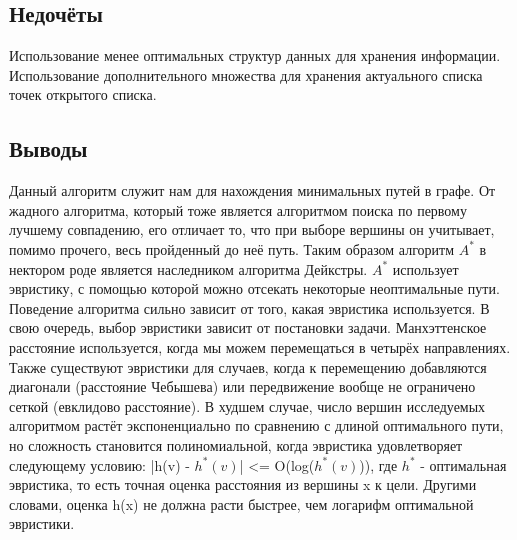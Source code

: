 \documentclass[12pt]{article}
\begin{document}
\subsection*{Недочёты}

Использование менее оптимальных структур данных для хранения информации.\\
Использование дополнительного множества для хранения актуального списка точек открытого списка.

\subsection*{Выводы}

Данный алгоритм служит нам для нахождения минимальных путей в графе. От жадного алгоритма, который тоже является алгоритмом поиска по первому лучшему совпадению, его отличает то, что при выборе вершины он учитывает, помимо прочего, весь пройденный до неё путь. Таким образом алгоритм $A^{*}$ в нектором роде является наследником алгоритма Дейкстры. $A^{*}$ использует эвристику, с помощью которой можно отсекать некоторые неоптимальные пути. Поведение алгоритма сильно зависит от того, какая эвристика используется. В свою очередь, выбор эвристики зависит от постановки задачи. Манхэттенское расстояние используется, когда мы можем перемещаться в четырёх направлениях. Также существуют эвристики для случаев, когда к перемещению добавляются диагонали (расстояние Чебышева) или передвижение вообще не ограничено сеткой (евклидово расстояние). В худшем случае, число вершин исследуемых алгоритмом растёт экспоненциально по сравнению с длиной оптимального пути, но сложность становится полиномиальной, когда эвристика удовлетворяет следующему условию: |h(v) - $h^{*}(v)$| <= O(log($h^{*}(v)$)), где $h^{*}$ - оптимальная эвристика, то есть точная оценка расстояния из вершины x к цели. Другими словами, оценка h(x) не должна расти быстрее, чем логарифм оптимальной эвристики.
\end{document}
